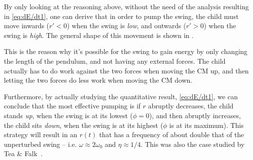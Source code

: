\documentclass[11pt,letter, swedish, english,%
]{article}
\begin{document}
By only looking at the reasoning above, without the need of the
analysis resulting in \eqref{eq:dE/dt1}, one can derive that in
order to pump the swing, the child must move inwards ($r'<0$) when the
swing is \emph{low}, and outwards ($r'>0$) when the swing is 
\emph{high}. The general shape of this movement is shown in
. 


This is the reason why it's possible for the swing to gain energy by
only changing the length of the pendulum, and not having any external
forces. The child actually has to do work against the two forces when
moving the CM up, and then letting  the two forces do less work
when moving the CM down.

Furthermore, by actually studying the quantitative result,
\eqref{eq:dE/dt1}, we can conclude that the most effective pumping
is if $r$ abruptly decreases, the child stands \emph{up}, when
the swing is at its lowest ($\phi=0$), and then abruptly increases,
the child sits \emph{down}, when the swing is at its highest ($\phi$
is at its maximum). This strategy will result in an $r(t)$ that has a 
frequency of about double that of the unperturbed swing --
i.e. $\omega\approx2\omega_0$ and $\eta\approx1/4$. 
This was also the case studied by Tea \& Falk~\cite{Tea_Falk_1968}.


\end{document}
